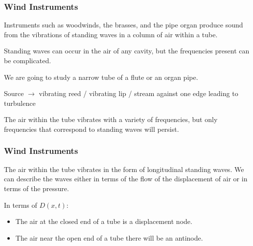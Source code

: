 \documentclass[]{beamer}
\begin{document}
\begin{frame}
\frametitle{Wind Instruments}

Instruments such as woodwinds, the brasses, and the pipe organ produce sound
from the vibrations of standing waves in a column of air within a tube.
\pause 
\vspace{3mm}

Standing waves can occur in the air of any cavity, but the frequencies present can be 
complicated.
\pause 
\vspace{3mm}

We are going to study a narrow tube of a flute or an organ pipe. 
\pause 
\vspace{3mm}

Source $\rightarrow$ vibrating reed / vibrating lip /  stream against one edge leading to turbulence
\pause 
\vspace{3mm}

The air within the tube vibrates with a variety of frequencies, but only frequencies that
correspond to standing waves will persist.

  \end{frame}





\begin{frame}
\frametitle{Wind Instruments}

 The air within the tube vibrates in the form of longitudinal standing waves. We can describe the waves either in terms of the flow of the displacement of air or in terms of the pressure.
\pause 
\vspace{3mm}

In terms of $D(x,t)$:
\vspace{3mm}

\begin{itemize}
\item The air at the closed end of a tube is a displacement node.
\vspace{3mm}
\pause

\item  The air near the open end of a tube there will be an antinode. 
\end{itemize}


 




  \end{frame}
\end{document}
